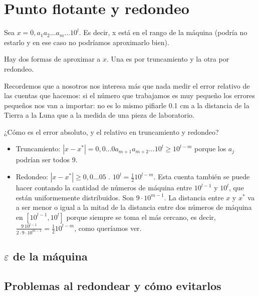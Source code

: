 \documentclass[10pt,a4paper,final]{report}
\begin{document}
\section{Punto flotante y redondeo}
{
	Sea $x=0,a_1 a_2...a_m... 10^l$. Es decir, x está en el rango de la máquina (podría no estarlo y en ese caso no podríamos aproximarlo bien).
	
Hay dos formas de aproximar a $x$. Una es por truncamiento y la otra por redondeo.

Recordemos que a nosotros nos interesa más que nada medir el error relativo de las cuentas que hacemos: si el número que trabajamos es muy pequeño los errores pequeños nos van a importar: no es lo mismo pifiarle 0.1 cm a la distancia de la Tierra a la Luna que a la medida de una pieza de laboratorio.

¿Cómo es el error absoluto, y el relativo en truncamiento y redondeo?

\begin{itemize}
	\item Truncamiento: $|x-x^*| = 0,0...0a_{m+1}a_{m+2}$...$ 10^l \geq 10^{l-m}$ porque los $a_j$ podrían ser todos 9.
	\item Redondeo: $|x-x^*| \geq 0,0$...$05$ . $ 10^l = \frac{1}{2} 10^{l-m}$. Esta cuenta también se puede hacer contando la cantidad de números de máquina entre $10^{l-1}$ y $10^{l}$, que están uniformemente distribuidos. Son $9\cdot 10^{m-1}$. La distancia entre $x$ y $x^*$ va a ser menor o igual a la mitad de la distancia entre dos números de máquina en $[10^{l-1}, 10^{l}]$ porque siempre se toma el más cercano, es decir, $\frac{9\ 10^{l-1}}{2\cdot 9\cdot 10^{m-1}} = \frac{1}{2} 10^{l-m}$, como queríamos ver.
\end{itemize}


\subsection{$\varepsilon$ de la máquina}

\subsection{Problemas al redondear y cómo evitarlos}

}
\end{document}
